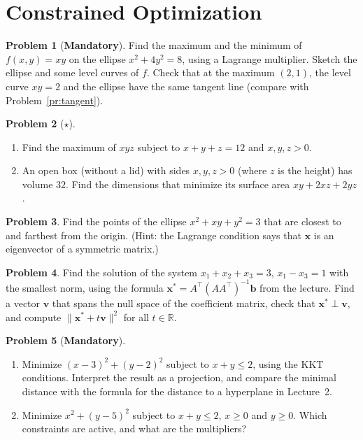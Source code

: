\documentclass[11pt]{article}
\theoremstyle{definition}
\newtheorem{problem}{Problem}[section]
\newcommand{\mandatory}{\textcolor{red!70!black}{\textbf{Mandatory}}}
\newcommand{\norm}[1]{\lVert #1 \rVert}
\begin{document}
\section{Constrained Optimization}

\begin{problem}[\mandatory]\label{pr:lagrange-ellipse}
    Find the maximum and the minimum of $f(x, y) = xy$ on the ellipse $x^2 + 4y^2 = 8$, using a Lagrange multiplier. Sketch the ellipse and some level curves of $f$. Check that at the maximum $(2, 1)$, the level curve $xy = 2$ and the ellipse have the same tangent line (compare with Problem~\ref{pr:tangent}).
\end{problem}

\begin{problem}[$\star$]\label{pr:max-xyz}
    \begin{enumerate}[label=(\alph*)]
        \item Find the maximum of $xyz$ subject to $x + y + z = 12$ and $x, y, z > 0$.
        \item An open box (without a lid) with sides $x, y, z > 0$ (where $z$ is the height) has volume $32$. Find the dimensions that minimize its surface area $xy + 2xz + 2yz$.
    \end{enumerate}
\end{problem}

\begin{problem}\label{pr:distance-ellipse}
    Find the points of the ellipse $x^2 + xy + y^2 = 3$ that are closest to and farthest from the origin. (Hint: the Lagrange condition says that $\mathbf{x}$ is an eigenvector of a symmetric matrix.)
\end{problem}

\begin{problem}\label{pr:min-norm-practice}
    Find the solution of the system $x_1 + x_2 + x_3 = 3$, $x_1 - x_3 = 1$ with the smallest norm, using the formula $\mathbf{x}^* = A^\top(AA^\top)^{-1}\mathbf{b}$ from the lecture. Find a vector $\mathbf{v}$ that spans the null space of the coefficient matrix, check that $\mathbf{x}^* \perp \mathbf{v}$, and compute $\norm{\mathbf{x}^* + t\mathbf{v}}^2$ for all $t \in \mathbb{R}$.
\end{problem}

\begin{problem}[\mandatory]\label{pr:kkt-projection}
    \begin{enumerate}[label=(\alph*)]
        \item Minimize $(x - 3)^2 + (y - 2)^2$ subject to $x + y \leq 2$, using the KKT conditions. Interpret the result as a projection, and compare the minimal distance with the formula for the distance to a hyperplane in Lecture~2.
        \item Minimize $x^2 + (y - 5)^2$ subject to $x + y \leq 2$, $x \geq 0$ and $y \geq 0$. Which constraints are active, and what are the multipliers?
    \end{enumerate}
\end{problem}
\end{document}
